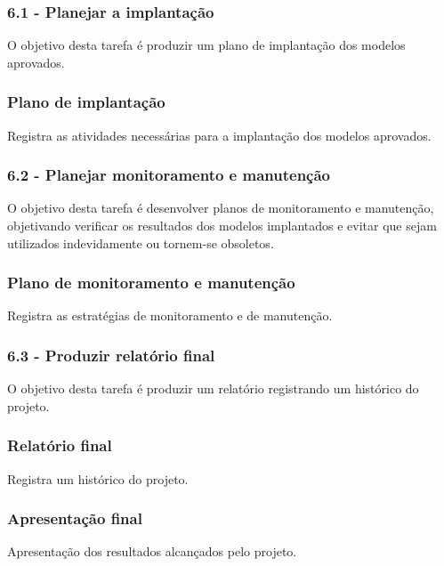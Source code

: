 
\subsubsection*{\textbf{6.1 - Planejar a implantação}}

O objetivo desta tarefa é produzir um plano de implantação dos modelos aprovados.

\subsubsection*{Plano de implantação}

Registra as atividades necessárias para a implantação dos modelos aprovados.

\subsubsection*{\textbf{6.2 - Planejar monitoramento e manutenção}}

O objetivo desta tarefa é desenvolver planos de monitoramento e manutenção, objetivando verificar os resultados dos modelos implantados e evitar que sejam utilizados indevidamente ou tornem-se obsoletos.

\subsubsection*{Plano de monitoramento e manutenção}

Registra as estratégias de monitoramento e de manutenção.

\subsubsection*{\textbf{6.3 - Produzir relatório final}}

O objetivo desta tarefa é produzir um relatório registrando um histórico do projeto.

\subsubsection*{Relatório final}

Registra um histórico do projeto.

\subsubsection*{Apresentação final}

Apresentação dos resultados alcançados pelo projeto.

